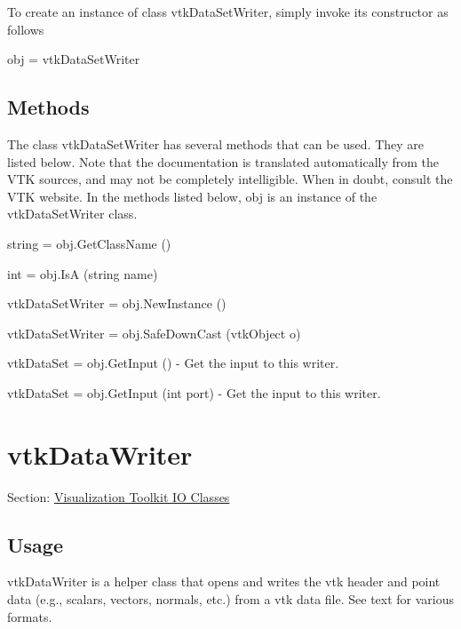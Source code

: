 To create an instance of class vtk\-Data\-Set\-Writer, simply invoke its constructor as follows \begin{DoxyVerb}  obj = vtkDataSetWriter
\end{DoxyVerb}
 \hypertarget{vtkwidgets_vtkxyplotwidget_Methods}{}\subsection{Methods}\label{vtkwidgets_vtkxyplotwidget_Methods}
The class vtk\-Data\-Set\-Writer has several methods that can be used. They are listed below. Note that the documentation is translated automatically from the V\-T\-K sources, and may not be completely intelligible. When in doubt, consult the V\-T\-K website. In the methods listed below, {\ttfamily obj} is an instance of the vtk\-Data\-Set\-Writer class. 
\begin{DoxyItemize}
\item {\ttfamily string = obj.\-Get\-Class\-Name ()}  
\item {\ttfamily int = obj.\-Is\-A (string name)}  
\item {\ttfamily vtk\-Data\-Set\-Writer = obj.\-New\-Instance ()}  
\item {\ttfamily vtk\-Data\-Set\-Writer = obj.\-Safe\-Down\-Cast (vtk\-Object o)}  
\item {\ttfamily vtk\-Data\-Set = obj.\-Get\-Input ()} -\/ Get the input to this writer.  
\item {\ttfamily vtk\-Data\-Set = obj.\-Get\-Input (int port)} -\/ Get the input to this writer.  
\end{DoxyItemize}\hypertarget{vtkio_vtkdatawriter}{}\section{vtk\-Data\-Writer}\label{vtkio_vtkdatawriter}
Section\-: \hyperlink{sec_vtkio}{Visualization Toolkit I\-O Classes} \hypertarget{vtkwidgets_vtkxyplotwidget_Usage}{}\subsection{Usage}\label{vtkwidgets_vtkxyplotwidget_Usage}
vtk\-Data\-Writer is a helper class that opens and writes the vtk header and point data (e.\-g., scalars, vectors, normals, etc.) from a vtk data file. See text for various formats.

